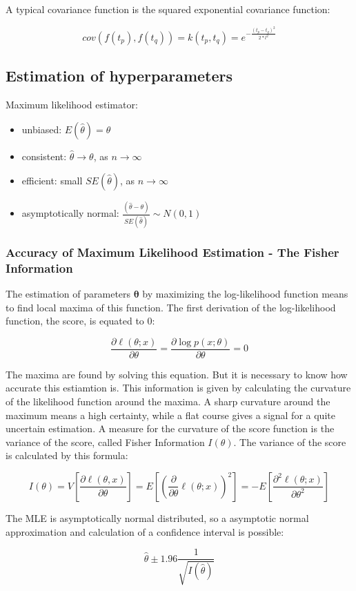 \documentclass[12pt]{article}
\begin{document}
	A typical covariance function is the squared exponential covariance function:
	
	\begin{displaymath}
	cov( f(t_{p} ), f(t_{q} )) = 
	k( t_{p} , t_{q} ) = 
	e^{-\frac{(t_{p}-t_{q})^2}{2*l^2}}
	\end{displaymath}
	
	
	\subsection{Estimation of hyperparameters}
	Maximum likelihood estimator:
	\begin{itemize}
		\item unbiased: $E(\hat{\theta}) = \theta$
		\item consistent: $\hat{\theta} \rightarrow \theta$, as $n \rightarrow \infty$
		\item efficient: small $SE(\hat{\theta})$, as $n \rightarrow \infty$
		\item asymptotically normal: $\frac{(\hat{\theta}-\theta)}{SE(\hat{\theta})} \sim N(0,1)$
	\end{itemize}
	\subsubsection{Accuracy of Maximum Likelihood Estimation - The Fisher Information}
	The estimation of parameters $\bm{\theta}$ by maximizing the log-likelihood function means to find local maxima of this function. 
	The first derivation of the log-likelihood function, the score, is equated to 0:
	
	\begin{displaymath}
	\frac{\partial \ell (\theta;x)}{\partial \theta}=\frac{\partial \log p(x;\theta)}{\partial \theta} = 0
	\end{displaymath}
	
	The maxima are found by solving this equation. 
	But it is necessary to know how accurate this estiamtion is. This information is given by calculating the curvature of the likelihood function around the maxima. A sharp curvature around the maximum means a high certainty, while a flat course gives a signal for a quite uncertain estimation.
	A measure for the curvature of the score function is the variance of the score, called Fisher Information $I(\theta)$. The variance of the score is calculated by this formula:
	
	\begin{displaymath}
	I(\theta)=
	V[\frac{\partial \ell (\theta,x)}{\partial \theta}]=
	E[(\frac{\partial}{\partial\theta}\ell(\theta;x))^{2}]=	
	-E[\frac{\partial^{2} \ell (\theta;x)}{\partial \theta^{2}}]
	\end{displaymath}
	
	The MLE is asymptotically normal distributed, so a asymptotic normal approximation and calculation of a confidence interval is possible:
	
	\begin{displaymath}
	\hat{\theta} \pm 1.96 \frac{1}{\sqrt{I(\hat{\theta})}} 
	\end{displaymath}
	
	
	
	
\end{document}
